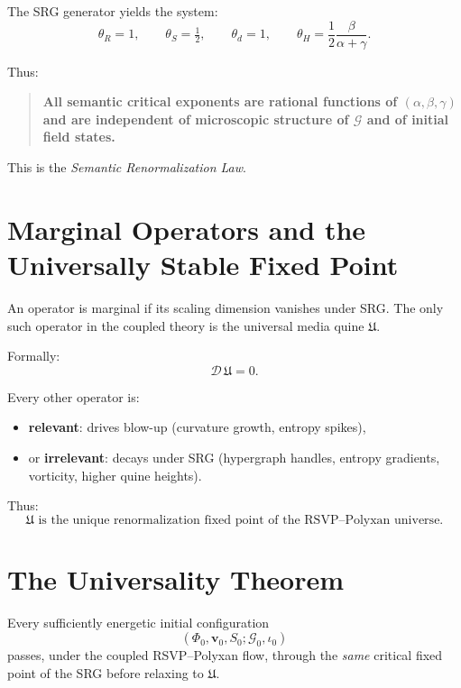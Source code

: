 The SRG generator yields the system:
\[
\theta_R = 1,\qquad
\theta_S = \tfrac{1}{2},\qquad
\theta_d = 1,\qquad
\theta_H = \frac{1}{2}\frac{\beta}{\alpha+\gamma}.
\]

Thus:

\begin{quote}
\textbf{All semantic critical exponents are rational functions of $(\alpha,\beta,\gamma)$ and are independent of microscopic structure of $\mathcal{G}$ and of initial field states.}
\end{quote}

This is the \emph{Semantic Renormalization Law}.

\section{Marginal Operators and the Universally Stable Fixed Point}

An operator is marginal if its scaling dimension vanishes under SRG.  
The only such operator in the coupled theory is the universal media quine $\mathfrak{U}$.

Formally:
\[
\mathcal{D}\,\mathfrak{U} = 0.
\]

Every other operator is:
\begin{itemize}
\item \textbf{relevant}: drives blow-up (curvature growth, entropy spikes),  
\item or \textbf{irrelevant}: decays under SRG (hypergraph handles, entropy gradients, vorticity, higher quine heights).  
\end{itemize}

Thus:
\[
\mathfrak{U} \text{ is the unique renormalization fixed point of the RSVP--Polyxan universe}.
\]

\section{The Universality Theorem}

\begin{theorem}
Every sufficiently energetic initial configuration  
\[
(\Phi_0,\mathbf{v}_0,S_0;\mathcal{G}_0,\iota_0)
\]
passes, under the coupled RSVP--Polyxan flow, through the \emph{same} critical fixed point of the SRG before relaxing to $\mathfrak{U}$.
\end{theorem}

